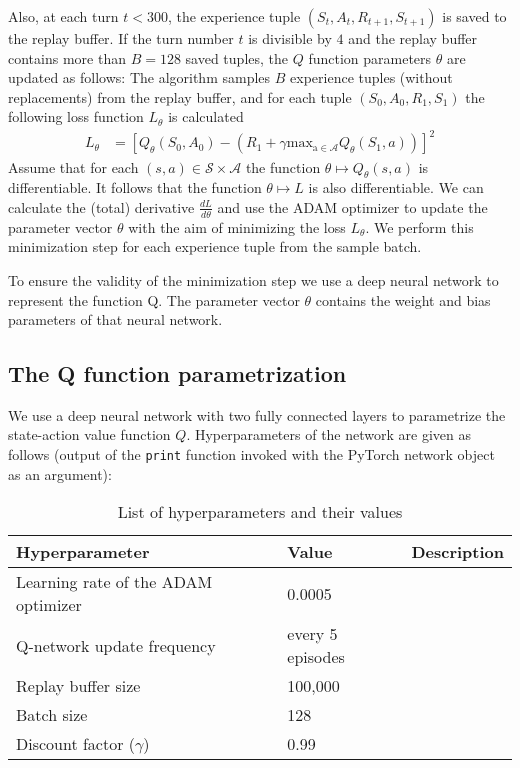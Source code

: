 \documentclass[a4paper,11pt]{amsart}
\begin{document}
Also, at each turn $t<300$, the experience tuple $\left( S_{t}, A_{t}, R_{t+1}, S_{t+1}
\right)$ is saved to the replay buffer. If the turn number $t$ is divisible by
$4$ and the replay buffer contains more than $B=128$ saved tuples, the $Q$
function parameters $\theta$ are updated as follows: The algorithm
samples $B$ experience tuples (without replacements) from the replay buffer, and
for each tuple $(S_0, A_0, R_1, S_1)$ the following loss function $L_\theta$ is
calculated
\begin{align*}
    L_{\theta} &= \left[ Q_{\theta}(S_0, A_0) - 
    \left( R_1 + \gamma \operatorname{max_{a\in\mathcal A}} Q_{\theta}(S_1, a) \right) \right]^2
\end{align*}
Assume that for each $(s, a) \in \mathcal S \times \mathcal A$ the function
$\theta \mapsto Q_{\theta}(s,a)$ is differentiable. It follows that the function
$\theta\mapsto L$ is also differentiable. We can calculate the (total) derivative
$\frac{d L}{d\theta}$ and use the ADAM optimizer to update the parameter vector 
$\theta$ with the aim of minimizing the loss $L_{\theta}$. We perform this 
minimization step for each experience tuple from the sample batch.

To ensure the validity of the minimization step we use a deep neural network to 
represent the function Q. The parameter vector $\theta$ contains the
weight and bias parameters of that neural network.

\subsection{The Q function parametrization}

We use a deep neural network with two fully connected layers to parametrize the
state-action value function $Q$. Hyperparameters of the network are given as
follows (output of the \texttt{print} function invoked with the PyTorch network
object as an argument):



\begin{table}
\caption{List of hyperparameters and their values}
\begin{tabular}{|l|l|l|}
    \hline
Hyperparameter & Value & Description \\ 
    \hline \hline
    Learning rate of the ADAM optimizer & 0.0005 &  \\
    Q-network update frequency & every 5 episodes &  \\
    Replay buffer size & 100,000 &  \\
    Batch size & 128  &  \\
    Discount factor ($\gamma$) & 0.99 &  \\
    \hline
\end{tabular}
\label{tab:hyperparameters}
\end{table}
\end{document}
